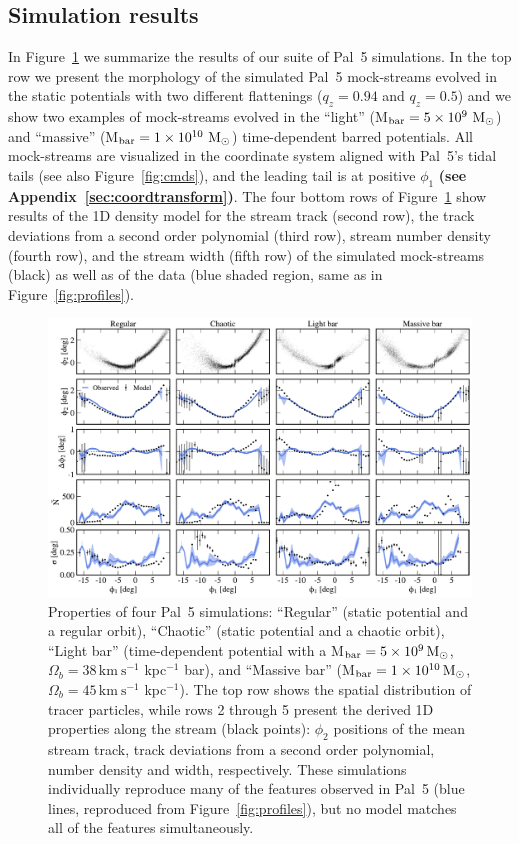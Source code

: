 \documentclass[twocolumn]{aastex62}
\newcommand{\msun}{\textrm{M}_\odot}
\newcommand{\kms}{\ensuremath{\textrm{km}~\textrm{s}^{-1}}}
\newcommand{\changes}[1]{{\textbf{#1}}}
\begin{document}
\subsection{Simulation results}
\label{sec:sim_results}
In Figure~\ref{fig:sims} we summarize the results of our suite of Pal~5 simulations.
In the top row we present the morphology of the simulated Pal~5 mock-streams evolved in the static potentials with two different flattenings ($q_z = 0.94$ and $q_z = 0.5$) and we show two examples of mock-streams evolved in the ``light'' (M$_{\rm bar} = 5\times 10^9~\msun$) and ``massive'' (M$_{\rm bar} = 1\times 10^{10}~\msun$) time-dependent barred potentials.
All mock-streams are visualized in the coordinate system aligned with Pal~5's tidal tails (see also Figure~\ref{fig:cmds}), and the leading tail is at positive $\phi_1$ \changes{(see Appendix~\ref{sec:coordtransform})}.
The four bottom rows of Figure~\ref{fig:sims} show results of the 1D density model for the stream track (second row), the track deviations from a second order polynomial (third row), stream number density (fourth row), and the stream width (fifth row) of the simulated mock-streams (black) as well as of the data (blue shaded region, same as in Figure~\ref{fig:profiles}).

\begin{figure}
\begin{center}
\includegraphics[width=\textwidth]{model_comparison.pdf}
\end{center}
\caption{
Properties of four Pal~5 simulations: ``Regular'' (static potential and a regular orbit), ``Chaotic'' (static potential and a chaotic orbit), ``Light bar'' (time-dependent potential with a M$_{\rm bar} = 5\times 10^{9}\,\msun$, $\Omega_b = 38\,\kms$ kpc$^{-1}$ bar), and ``Massive bar'' (M$_{\rm bar} = 1\times 10^{10}\,\msun$, $\Omega_b = 45\,\kms$ kpc$^{-1}$).
The top row shows the spatial distribution of tracer particles, while rows 2 through 5 present the derived 1D properties along the stream (black points): $\phi_2$ positions of the mean stream track, track deviations from a second order polynomial, number density and width, respectively.
These simulations individually reproduce many of the features observed in Pal~5 (blue lines, reproduced from Figure~\ref{fig:profiles}), but no model matches all of the features simultaneously.
}
\label{fig:sims}
\end{figure}
\end{document}
